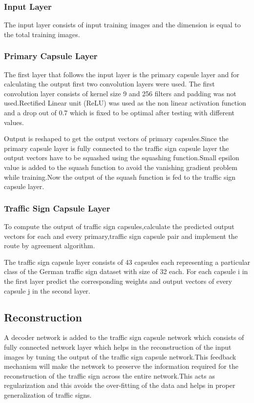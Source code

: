 \documentclass[letterpaper, 10 pt, conference]{ieeeconf}  %
\begin{document}
\subsubsection{Input Layer}
The input layer consists of input training images and the dimension is equal to the total training images.
\subsubsection{Primary Capsule Layer}
The first layer that follows the input layer is the primary capsule layer and for calculating the output first two convolution layers were used.
The first convolution layer consists of kernel size 9 and 256 filters and padding was not used.Rectified Linear unit (ReLU) was used as the non linear activation function and a drop out of 0.7 which is fixed to be optimal after testing with different values.\par
Output is reshaped to get the output vectors of primary capsules.Since the primary capsule layer is fully connected to the traffic sign capsule layer the output vectors have to be squashed using the squashing function.Small epsilon value is added to the squash function to avoid the vanishing gradient problem while training.Now the output of the squash function is fed to the traffic sign capsule layer.

\subsubsection{Traffic Sign Capsule Layer}
To compute the output of traffic sign capsules,calculate the predicted output vectors for each and every primary,traffic sign capsule pair and implement the route by agreement algorithm.\par
The traffic sign capsule layer consists of 43 capsules each representing a particular class of the German traffic sign dataset with size of 32 each.
For each capsule i in the first layer predict the corresponding weights and output vectors of every capsule j in the second layer.

\subsection{Reconstruction}
A decoder network is added to the traffic sign capsule network which consists of fully connected network layer which helps in the reconstruction of the input images by tuning the output of the traffic sign capsule network.This feedback mechanism will make the network to preserve the information required for the reconstruction of the traffic sign across the entire network.This acts as regularization and this avoids the over-fitting of the data and helps in proper generalization of traffic signs.
\end{document}
